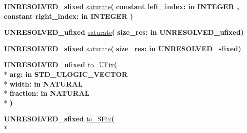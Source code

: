\begin{DoxyCompactItemize}
\item 
{\bfseries {\bfseries \textcolor{vhdlchar}{U\+N\+R\+E\+S\+O\+L\+V\+E\+D\+\_\+sfixed}\textcolor{vhdlchar}{ }}} \hyperlink{class__fixed__pkg_a53d2b082cd4171c5f98659bc00937b62}{saturate}{\bfseries  ( }{\bfseries {\bfseries \textcolor{keywordflow}{constant}\textcolor{vhdlchar}{ }}\textcolor{vhdlchar}{left\+\_\+index\+: }\textcolor{stringliteral}{in }{\bfseries \textcolor{comment}{I\+N\+T\+E\+G\+E\+R}\textcolor{vhdlchar}{ }}}{\bfseries  , {\bfseries \textcolor{keywordflow}{constant}\textcolor{vhdlchar}{ }}\textcolor{vhdlchar}{right\+\_\+index\+: }\textcolor{stringliteral}{in }{\bfseries \textcolor{comment}{I\+N\+T\+E\+G\+E\+R}\textcolor{vhdlchar}{ }}}{\bfseries  )} 
\item 
{\bfseries {\bfseries \textcolor{vhdlchar}{U\+N\+R\+E\+S\+O\+L\+V\+E\+D\+\_\+ufixed}\textcolor{vhdlchar}{ }}} \hyperlink{class__fixed__pkg_a5a4a80fca4ce1ae0ce0349f711403504}{saturate}{\bfseries  ( }{\bfseries \textcolor{vhdlchar}{size\+\_\+res\+: }\textcolor{stringliteral}{in }\textcolor{vhdlchar}{U\+N\+R\+E\+S\+O\+L\+V\+E\+D\+\_\+ufixed}}{\bfseries  )} 
\item 
{\bfseries {\bfseries \textcolor{vhdlchar}{U\+N\+R\+E\+S\+O\+L\+V\+E\+D\+\_\+sfixed}\textcolor{vhdlchar}{ }}} \hyperlink{class__fixed__pkg_a9fbb6432e98395eb6d27020bf82657f2}{saturate}{\bfseries  ( }{\bfseries \textcolor{vhdlchar}{size\+\_\+res\+: }\textcolor{stringliteral}{in }\textcolor{vhdlchar}{U\+N\+R\+E\+S\+O\+L\+V\+E\+D\+\_\+sfixed}}{\bfseries  )} 
\item 
{\bfseries {\bfseries \textcolor{vhdlchar}{U\+N\+R\+E\+S\+O\+L\+V\+E\+D\+\_\+ufixed}\textcolor{vhdlchar}{ }}} \hyperlink{class__fixed__pkg_a8958e5546182abd6114937a60e629a90}{to\+\_\+\+U\+Fix}{\bfseries  ( }\\*
{\bfseries \textcolor{vhdlchar}{arg\+: }\textcolor{stringliteral}{in }{\bfseries \textcolor{comment}{S\+T\+D\+\_\+\+U\+L\+O\+G\+I\+C\+\_\+\+V\+E\+C\+T\+O\+R}\textcolor{vhdlchar}{ }}}\\*
{\bfseries \textcolor{vhdlchar}{width\+: }\textcolor{stringliteral}{in }{\bfseries \textcolor{comment}{N\+A\+T\+U\+R\+A\+L}\textcolor{vhdlchar}{ }}}\\*
{\bfseries \textcolor{vhdlchar}{fraction\+: }\textcolor{stringliteral}{in }{\bfseries \textcolor{comment}{N\+A\+T\+U\+R\+A\+L}\textcolor{vhdlchar}{ }}}\\*
{\bfseries  )} 
\item 
{\bfseries {\bfseries \textcolor{vhdlchar}{U\+N\+R\+E\+S\+O\+L\+V\+E\+D\+\_\+sfixed}\textcolor{vhdlchar}{ }}} \hyperlink{class__fixed__pkg_a5206ba96e8fde8df1ad0cc58d7ea3a8b}{to\+\_\+\+S\+Fix}{\bfseries  ( }\\*

\end{DoxyCompactItemize}
